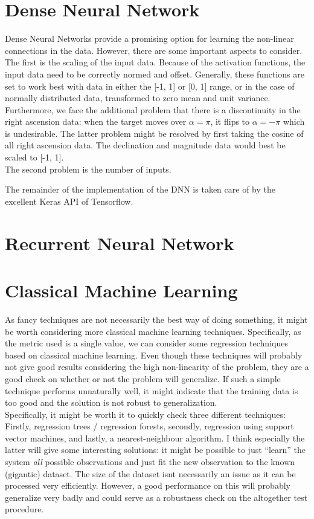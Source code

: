 \documentclass[a4paper,10pt]{article}
\begin{document}
\section{Dense Neural Network}

Dense Neural Networks provide a promising option for learning the non-linear connections in the data. However, there are some important aspects to consider. The first is the scaling of the input data. Because of the activation functions, the input data need to be correctly normed and offset. Generally, these functions are set to work best with data in either the [-1, 1] or [0, 1] range, or in the case of normally distributed data, transformed to zero mean and unit variance. Furthermore, we face the additional problem that there is a discontinuity in the right ascension data: when the target moves over $\alpha = \pi$, it flips to $\alpha = -\pi$ which is undesirable. The latter problem might be resolved by first taking the cosine of all right ascension data. The declination and magnitude data would best be scaled to [-1, 1]. \\

The second problem is the number of inputs. 



The remainder of the implementation of the DNN is taken care of by the excellent Keras API of Tensorflow. 

\section{Recurrent Neural Network}

\section{Classical Machine Learning}

As fancy techniques are not necessarily the best way of doing something, it might be worth considering more classical machine learning techniques. Specifically, as the metric used is a single value, we can consider some regression techniques based on classical machine learning. Even though these techniques will probably not give good results considering the high non-linearity of the problem, they are a good check on whether or not the problem will generalize. If such a simple technique performs unnaturally well, it might indicate that the training data is too good and the solution is not robust to generalization.\\

Specifically, it might be worth it to quickly check three different techniques: Firstly, regression trees / regression forests, secondly, regression using support vector machines, and lastly, a nearest-neighbour algorithm. I think especially the latter will give some interesting solutions: it might be possible to just ``learn'' the system \textit{all} possible observations and just fit the new observation to the known (gigantic) dataset. The size of the dataset isnt necessarily an issue as it can be processed very efficiently. However, a good performance on this will probably generalize very badly and could serve as a robustness check on the altogether test procedure.
\end{document}
